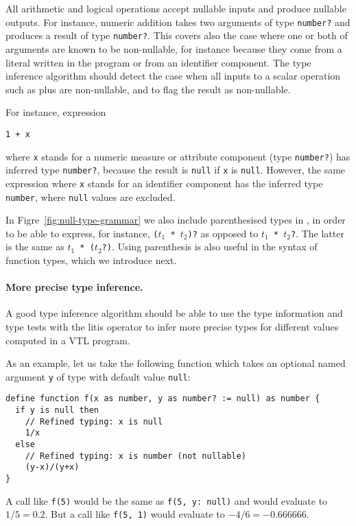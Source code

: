 \documentclass[droidmono,libertine,twoside,user,unofficial]{ecarticle}
\def\<#1>{\synt{#1}}
\begin{document}
All arithmetic and logical operations accept nullable inputs and
produce nullable outputs.  For instance, numeric addition takes two
arguments of type \texttt{number?} and produces a result of type
\texttt{number?}.  This covers also the case where one or both of
arguments are known to be non-nullable, for instance because they come
from a literal written in the program or from an identifier
component. The type inference algorithm should detect the case when
all inputs to a scalar operation such as plus are non-nullable, and to
flag the result as non-nullable.

For instance, expression
\begin{lstlisting}
1 + x 
\end{lstlisting}
where \texttt{x} stands for a numeric measure or attribute component
(type \texttt{number?}) has inferred type \texttt{number?}, because
the result is \texttt{null} if \texttt{x} is \texttt{null}.
%
However, the same expression where \texttt{x} stands for an identifier
component has the inferred type \texttt{number}, where \texttt{null}
values are excluded.

In Figre~\ref{fig:null-type-grammar} we also include parenthesised
types in \<type-factor>, in order to be able to express, for instance,
\texttt{($t_1$ * $t_2$)?} as opposed to \texttt{$t_1$ * $t_2$?}.  The
latter is the same as \texttt{$t_1$ * ($t_2$?)}.  Using parenthesis is
also useful in the syntax of function types, which we introduce next.

\paragraph{More precise type inference.}

A good type inference algorithm should be able to use the type
information and type tests with the lit{is} operator to infer more
precise types for different values computed in a VTL program.

As an example, let us take the following function which takes an
optional named argument \texttt{y} of type  with default
value \texttt{null}:
\begin{lstlisting}
define function f(x as number, y as number? := null) as number {
  if y is null then
    // Refined typing: x is null
    1/x
  else
    // Refined typing: x is number (not nullable)
    (y-x)/(y+x)
}
\end{lstlisting}

A call like \texttt{f(5)} would be the same as \texttt{f(5, y: null)}
and would evaluate to $1/5 = 0.2$.  But a call like \texttt{f(5, 1)}
would evaluate to $-4/6=-0.666666$.
\end{document}
